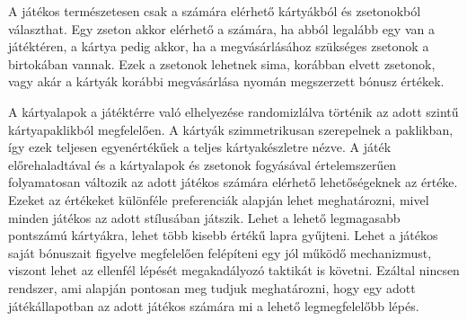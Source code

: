 A játékos természetesen csak a számára elérhető kártyákból és zsetonokból választhat. Egy zseton akkor elérhető a számára, ha abból legalább egy van a játéktéren, a kártya pedig akkor, ha a megvásárlásához szükséges zsetonok a birtokában vannak. Ezek a zsetonok lehetnek sima, korábban elvett zsetonok, vagy akár a kártyák korábbi megvásárlása nyomán megszerzett bónusz értékek.

A kártyalapok a játéktérre való elhelyezése randomizlálva történik az adott szintű kártyapaklikból megfelelően. A kártyák szimmetrikusan szerepelnek a paklikban, így ezek teljesen egyenértékűek a teljes kártyakészletre nézve. A játék előrehaladtával és a kártyalapok és zsetonok fogyásával értelemszerűen folyamatosan változik az adott játékos számára elérhető lehetőségeknek az értéke. Ezeket az értékeket különféle preferenciák alapján lehet meghatározni, mivel minden játékos az adott stílusában játszik. Lehet a lehető legmagasabb pontszámú kártyákra, lehet több kisebb értékű lapra gyűjteni. Lehet a játékos saját bónuszait figyelve megfelelően felépíteni egy jól működő mechanizmust, viszont lehet az ellenfél lépését megakadályozó taktikát is követni. Ezáltal nincsen rendszer, ami alapján pontosan meg tudjuk meghatározni, hogy egy adott játékállapotban az adott játékos számára mi a lehető legmegfelelőbb lépés.

